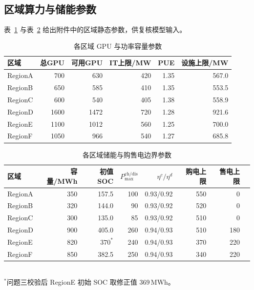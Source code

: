 \documentclass[UTF8,a4paper,zihao=-4]{ctexart}
\begin{document}
\subsection{区域算力与储能参数}

表~\ref{tab:app-gpu} 与表~\ref{tab:app-storage} 给出附件中的区域静态参数，供复核模型输入。

\begin{table}[H]
\centering
\footnotesize
\caption{各区域 GPU 与功率容量参数}
\label{tab:app-gpu}
\setlength{\tabcolsep}{3.5pt}
\begin{tabular}{lrrrrr}
\toprule
区域 & 总GPU & 可用GPU & IT上限/MW & PUE & 设施上限/MW \\
\midrule
RegionA & 700 & 630 & 420 & 1.35 & 567.0 \\
RegionB & 650 & 585 & 410 & 1.35 & 553.5 \\
RegionC & 600 & 540 & 405 & 1.38 & 558.9 \\
RegionD & 1600 & 1472 & 720 & 1.28 & 921.6 \\
RegionE & 1100 & 1012 & 560 & 1.25 & 700.0 \\
RegionF & 1050 & 966 & 540 & 1.27 & 685.8 \\
\bottomrule
\end{tabular}
\end{table}

\begin{table}[H]
\centering
\footnotesize
\caption{各区域储能与购售电边界参数}
\label{tab:app-storage}
\setlength{\tabcolsep}{2.8pt}
\begin{tabular}{lrrrrrrr}
\toprule
区域 & 容量/MWh & 初值SOC & $P_{\max}^{\mathrm{ch/dis}}$ & $\eta^{c}/\eta^{d}$ & 购电上限 & 售电上限 \\
\midrule
RegionA & 350 & 157.5 & 100 & 0.93/0.92 & 550 & 0 \\
RegionB & 320 & 144.0 & 90 & 0.93/0.92 & 520 & 0 \\
RegionC & 300 & 135.0 & 85 & 0.93/0.92 & 510 & 0 \\
RegionD & 900 & 405.0 & 260 & 0.94/0.93 & 510 & 180 \\
RegionE & 820 & $370^{*}$ & 240 & 0.94/0.93 & 370 & 220 \\
RegionF & 850 & 382.5 & 250 & 0.94/0.93 & 340 & 220 \\
\bottomrule
\end{tabular}\\[0.3em]
{\footnotesize $^{*}$问题三校验后 RegionE 初始 SOC 取修正值 $369$\,MWh。}
\end{table}
\end{document}
